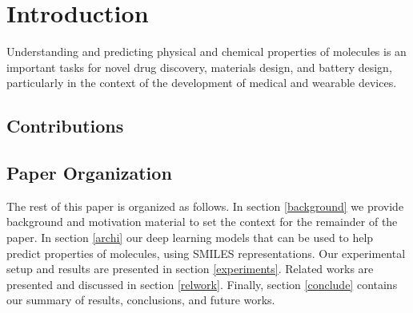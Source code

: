 \section{Introduction \label{intro}}
Understanding and predicting physical and chemical properties of molecules is an important tasks for novel drug discovery, materials design, and battery design, particularly in the context of the   development of medical and wearable devices.

\subsection{Contributions}
\subsection{Paper Organization}
The rest of this paper is organized as follows. In section \ref{background} we provide background and motivation material to set the context for the remainder of the paper. In section \ref{archi} our deep learning models that can be used to help predict properties of molecules, using SMILES representations. Our experimental setup and results are presented in section \ref{experiments}. Related works are presented and discussed in section \ref{relwork}. Finally, section \ref{conclude} contains our summary of results, conclusions, and future works.
